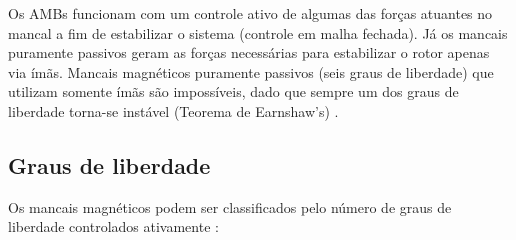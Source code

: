 Os AMBs funcionam com um controle ativo de algumas das forças atuantes no mancal a fim de estabilizar o sistema (controle em malha fechada). Já os mancais puramente passivos geram as forças necessárias para estabilizar o rotor apenas via ímãs.
Mancais magnéticos puramente passivos (seis graus de liberdade) que utilizam somente ímãs são impossíveis, dado que sempre um dos graus de liberdade torna-se instável (Teorema de Earnshaw's) \citep[pg. 20]{Schweitzer2009}.


\subsection{Graus de liberdade}

Os mancais magnéticos podem ser classificados pelo número de graus de liberdade controlados ativamente \citep{Schweitzer2009}:

